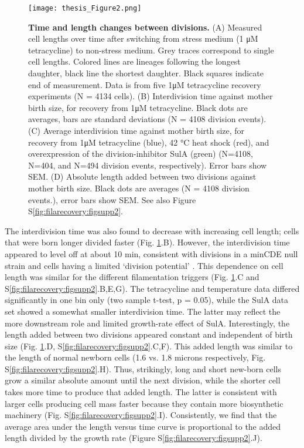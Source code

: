 \begin{figure}
    \centering
    \texttt{[image: thesis\_Figure2.png]}
    \caption{ 
        \textbf{Time and length changes between divisions.}
        (A) Measured cell lengths over time after switching from stress medium (1 μM tetracycline) to non-stress medium. Grey traces correspond to single cell lengths. Colored lines are lineages following the longest daughter, black line the shortest daughter. Black squares indicate end of measurement. Data is from five 1μM tetracycline recovery experiments (N = 4134 cells). (B) Interdivision time against mother birth size, for recovery from 1μM tetracycline. Black dots are averages, bars are standard deviations (N = 4108 division events). (C) Average interdivision time against mother birth size, for recovery from 1μM tetracycline (blue), 42 °C heat shock (red), and overexpression of the division-inhibitor SulA (green) (N=4108, N=404, and  N=494 division events, respectively). Error bars show SEM. (D) Absolute length added between two divisions against mother birth size. Black dots are averages (N = 4108 division events.), error bars show SEM. See also Figure S\ref{fig:filarecovery:figsupp2}.
    }
    \label{fig:filarecovery:fig2} %
\end{figure}

The interdivision time was also found to decrease with increasing cell length; cells that were born longer divided faster (Fig. \ref{fig:filarecovery:fig2}.B). However, the interdivision time appeared to level off at about 10 min, consistent with divisions in a minCDE null strain and cells having a limited ‘division potential’ \cite{Donachie1996}. This dependence on cell length was similar for the different filamentation triggers (Fig. \ref{fig:filarecovery:fig2}.C and S\ref{fig:filarecovery:figsupp2}.B,E,G). The tetracycline and temperature data differed significantly in one bin only (two sample t-test, p = 0.05), while the SulA data set showed a somewhat smaller interdivision time. The latter may reflect the more downstream role and limited growth-rate effect of SulA. Interestingly, the length added between two divisions appeared constant and independent of birth size (Fig. \ref{fig:filarecovery:fig2}.D, S\ref{fig:filarecovery:figsupp2}.C,F). This added length was similar to the length of normal newborn cells (1.6 vs. 1.8 microns respectively, Fig. S\ref{fig:filarecovery:figsupp2}.H). Thus, strikingly, long and short new-born cells grow a similar absolute amount until the next division, while the shorter cell takes more time to produce that added length. The latter is consistent with larger cells producing cell mass faster because they contain more biosynthetic machinery (Fig. S\ref{fig:filarecovery:figsupp2}.I). Consistently, we find that the average area under the length versus time curve is proportional to the added length divided by the growth rate (Figure S\ref{fig:filarecovery:figsupp2}.J). 

